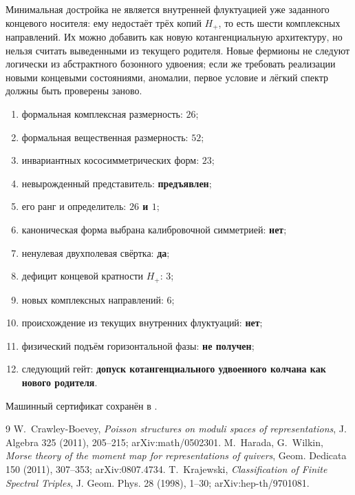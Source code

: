 \begin{nogocriterion}[Концевой no-go]
Минимальная достройка не является внутренней флуктуацией уже заданного
концевого носителя: ему недостаёт трёх копий $H_+$, то есть шести
комплексных направлений. Их можно добавить как новую котангенциальную
архитектуру, но нельзя считать выведенными из текущего родителя. Новые
фермионы не следуют логически из абстрактного бозонного удвоения; если же
требовать реализации новыми концевыми состояниями, аномалии, первое условие
и лёгкий спектр должны быть проверены заново.
\end{nogocriterion}

\begin{protocol}
\begin{enumerate}
 \item формальная комплексная размерность: \textbf{$26$};
 \item формальная вещественная размерность: \textbf{$52$};
 \item инвариантных кососимметрических форм: \textbf{$23$};
 \item невырожденный представитель: \textbf{предъявлен};
 \item его ранг и определитель: \textbf{$26$ и $1$};
 \item каноническая форма выбрана калибровочной симметрией: \textbf{нет};
 \item ненулевая двухполевая свёртка: \textbf{да};
 \item дефицит концевой кратности $H_+$: \textbf{$3$};
 \item новых комплексных направлений: \textbf{$6$};
 \item происхождение из текущих внутренних флуктуаций: \textbf{нет};
 \item физический подъём горизонтальной фазы: \textbf{не получен};
 \item следующий гейт: \textbf{допуск котангенциального удвоенного
 колчана как нового родителя}.
\end{enumerate}
\end{protocol}

Машинный сертификат сохранён в
.

\begin{thebibliography}{9}
W.~Crawley-Boevey,
\emph{Poisson structures on moduli spaces of representations},
J. Algebra 325 (2011), 205--215; arXiv:math/0502301.
M.~Harada, G.~Wilkin,
\emph{Morse theory of the moment map for representations of quivers},
Geom. Dedicata 150 (2011), 307--353; arXiv:0807.4734.
T.~Krajewski,
\emph{Classification of Finite Spectral Triples},
J. Geom. Phys. 28 (1998), 1--30; arXiv:hep-th/9701081.
\end{thebibliography}